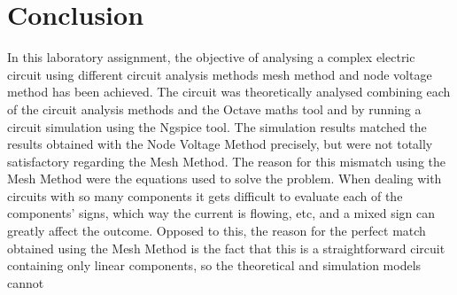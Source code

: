 \section{Conclusion}
\label{sec:conclusion}

In this laboratory assignment, the objective of analysing a complex electric circuit using different circuit analysis methods mesh method and node voltage method has been achieved. The circuit was theoretically analysed combining each of the circuit analysis methods and the Octave maths tool and by running a circuit simulation using the Ngspice tool. The simulation results matched the results obtained with the Node Voltage Method precisely, but were not totally satisfactory regarding the Mesh Method. The reason for this mismatch using the Mesh Method were the equations used to solve the problem. When dealing with circuits with so many components it gets difficult to evaluate each of the components' signs, which way the current is flowing, etc, and a mixed sign can greatly affect the outcome. Opposed to this, the reason for the perfect match obtained using the Mesh Method is the fact that this is a straightforward circuit containing only linear components, so the theoretical and simulation models cannot 
